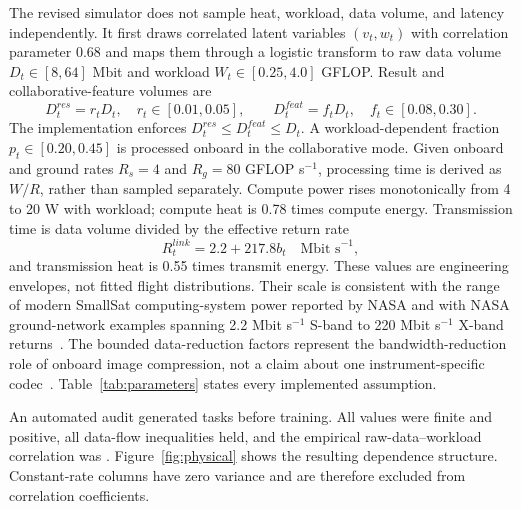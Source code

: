 \documentclass[11pt]{article}
\begin{document}
The revised simulator does not sample heat, workload, data volume, and latency independently. It first draws correlated latent variables $(v_t,w_t)$ with correlation parameter 0.68 and maps them through a logistic transform to raw data volume $D_t\in[8,64]$ Mbit and workload $W_t\in[0.25,4.0]$ GFLOP. Result and collaborative-feature volumes are
\begin{equation}
D_t^{res}=r_tD_t,\quad r_t\in[0.01,0.05],\qquad
D_t^{feat}=f_tD_t,\quad f_t\in[0.08,0.30].
\end{equation}
The implementation enforces $D_t^{res}\le D_t^{feat}\le D_t$. A workload-dependent fraction $p_t\in[0.20,0.45]$ is processed onboard in the collaborative mode. Given onboard and ground rates $R_s=4$ and $R_g=80$ GFLOP s$^{-1}$, processing time is derived as $W/R$, rather than sampled separately. Compute power rises monotonically from 4 to 20 W with workload; compute heat is 0.78 times compute energy. Transmission time is data volume divided by the effective return rate
\begin{equation}
R_t^{link}=2.2+217.8b_t\quad\text{Mbit s}^{-1},
\end{equation}
and transmission heat is 0.55 times transmit energy. These values are engineering envelopes, not fitted flight distributions. Their scale is consistent with the range of modern SmallSat computing-system power reported by NASA and with NASA ground-network examples spanning 2.2 Mbit s$^{-1}$ S-band to 220 Mbit s$^{-1}$ X-band returns~\cite{nasa2026avionics,nasa2026ground}. The bounded data-reduction factors represent the bandwidth-reduction role of onboard image compression, not a claim about one instrument-specific codec~\cite{ccsds122}. Table~\ref{tab:parameters} states every implemented assumption.

\begin{table}[H]
\centering
\caption{Physical primitives and provenance of the revised simulator. Values define a transparent engineering envelope; they are not presented as a fitted flight distribution.}
\label{tab:parameters}
\resizebox{\textwidth}{!}{}
\end{table}

An automated audit generated \PhysicalAuditTasks{} tasks before training. All values were finite and positive, all data-flow inequalities held, and the empirical raw-data--workload correlation was \PhysicalCorrDataWork. Figure~\ref{fig:physical} shows the resulting dependence structure. Constant-rate columns have zero variance and are therefore excluded from correlation coefficients.
\end{document}
